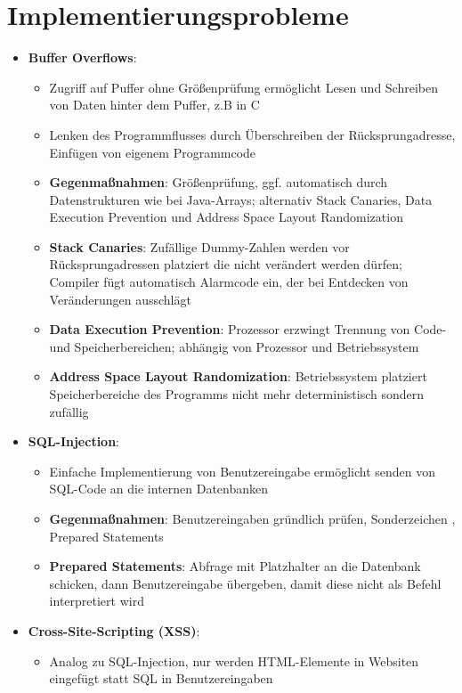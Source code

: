 \section{Implementierungsprobleme}%
\label{improb:sec:implementierungsprobleme}

\begin{itemize}
	\item \textbf{Buffer Overflows}:
	\begin{itemize}
		\item Zugriff auf Puffer ohne Größenprüfung ermöglicht Lesen und Schreiben von Daten hinter dem Puffer, z.B in C
		\item Lenken des Programmflusses durch Überschreiben der Rücksprungadresse, Einfügen von eigenem Programmcode
		\item \textbf{Gegenmaßnahmen}: Größenprüfung, ggf. automatisch durch Datenstrukturen wie bei Java-Arrays; alternativ Stack Canaries, Data Execution Prevention und Address Space Layout Randomization
		\item \textbf{Stack Canaries}: Zufällige Dummy-Zahlen werden vor Rücksprungadressen platziert die nicht verändert werden dürfen; Compiler fügt automatisch Alarmcode ein, der bei Entdecken von Veränderungen ausschlägt
		\item \textbf{Data Execution Prevention}: Prozessor erzwingt Trennung von Code- und Speicherbereichen; abhängig von Prozessor und Betriebssystem
		\item \textbf{Address Space Layout Randomization}: Betriebssystem platziert Speicherbereiche des Programms nicht mehr deterministisch sondern zufällig
	\end{itemize}
	\item \textbf{SQL-Injection}:
	\begin{itemize}
		\item Einfache Implementierung von Benutzereingabe ermöglicht senden von SQL-Code an die internen Datenbanken
		\item \textbf{Gegenmaßnahmen}: Benutzereingaben gründlich prüfen, Sonderzeichen , Prepared Statements
		\item \textbf{Prepared Statements}: Abfrage mit Platzhalter an die Datenbank schicken, dann Benutzereingabe übergeben, damit diese nicht als Befehl interpretiert wird
	\end{itemize}
	\item \textbf{Cross-Site-Scripting (XSS)}:
	\begin{itemize}
		\item Analog zu SQL-Injection, nur werden HTML-Elemente in Websiten eingefügt statt SQL in Benutzereingaben

\end{itemize}
\end{itemize}
